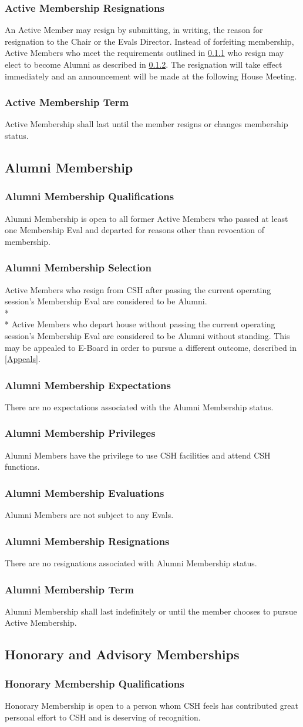 \documentclass{article}
\newcommand{\asection}[1]{\subsection{#1} \label{#1}}
\newcommand{\asubsection}[1]{\subsubsection{#1} \label{#1}}
\begin{document}
\asubsection{Active Membership Resignations}
An Active Member may resign by submitting, in writing, the reason for resignation to the Chair or the Evals Director.
Instead of forfeiting membership, Active Members who meet the requirements outlined in \ref{Alumni Membership Qualifications} who resign may elect to become Alumni as described in \ref{Alumni Membership Selection}.
The resignation will take effect immediately and an announcement will be made at the following House Meeting.

\asubsection{Active Membership Term}
Active Membership shall last until the member resigns or changes membership status.

\asection{Alumni Membership}

\asubsection{Alumni Membership Qualifications}
Alumni Membership is open to all former Active Members who passed at least one Membership Eval and departed for reasons other than revocation of membership.

\asubsection{Alumni Membership Selection}
Active Members who resign from CSH after passing the current operating session's Membership Eval are considered to be Alumni.
\\*\\*
Active Members who depart house without passing the current operating session's Membership Eval are considered to be Alumni without standing.
This may be appealed to E-Board in order to pursue a different outcome, described in \ref{Appeals}.

\asubsection{Alumni Membership Expectations}
There are no expectations associated with the Alumni Membership status.

\asubsection{Alumni Membership Privileges}
Alumni Members have the privilege to use CSH facilities and attend CSH functions.

\asubsection{Alumni Membership Evaluations}
Alumni Members are not subject to any Evals.

\asubsection{Alumni Membership Resignations}
There are no resignations associated with Alumni Membership status.

\asubsection{Alumni Membership Term}
Alumni Membership shall last indefinitely or until the member chooses to pursue Active Membership.

\asection{Honorary and Advisory Memberships}

\asubsection{Honorary Membership Qualifications}
Honorary Membership is open to a person whom CSH feels has contributed great personal effort to CSH and is deserving of recognition.
\end{document}
